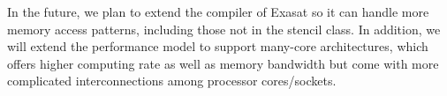 \documentclass{article}
\begin{document}
In the future, we plan to extend the compiler of Exasat so it can handle more memory access patterns, including those not in the stencil class.
In addition, we will extend the performance model to support many-core architectures, which offers higher computing rate as well as memory bandwidth but come with more complicated interconnections among processor cores/sockets.

{}

\end{document}
